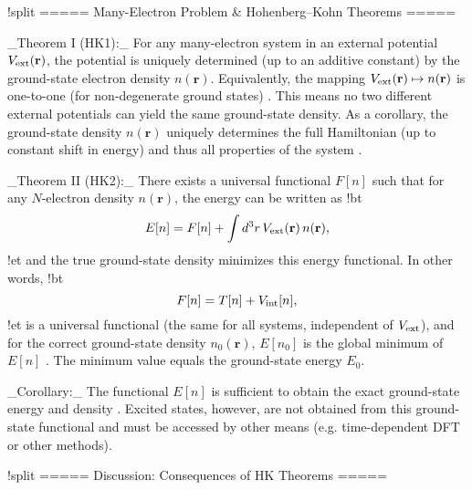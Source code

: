 !split
===== Many-Electron Problem & Hohenberg–Kohn Theorems =====


_Theorem I (HK1):_ For any many-electron system in an external potential $V_{\rm ext}(\mathbf{r})$, the potential is uniquely determined (up to an additive constant) by the ground-state electron density $n(\mathbf{r})$. Equivalently, the mapping $V_{\rm ext}(\mathbf{r}) \mapsto n(\mathbf{r})$ is one-to-one (for non-degenerate ground states) . This means no two different external potentials can yield the same ground-state density. As a corollary, the ground-state density $n(\mathbf{r})$ uniquely determines the full Hamiltonian (up to constant shift in energy) and thus all properties of the system .

_Theorem II (HK2):_ There exists a universal functional $F[n]$ such that for any $N$-electron density $n(\mathbf{r})$, the energy can be written as
!bt
\[
E[n] = F[n] + \int d^3r\,V_{\rm ext}(\mathbf{r})\,n(\mathbf{r}),
\]
!et
and the true ground-state density minimizes this energy functional. In other words,
!bt
\[
F[n] = T[n] + V_{\rm int}[n],
\]
!et
is a universal functional (the same for all systems, independent of $V_{\rm ext}$), and for the correct ground-state density $n_0(\mathbf{r})$, $E[n_0]$ is the global minimum of $E[n]$ . The minimum value equals the ground-state energy $E_0$.

_Corollary:_ The functional $E[n]$ is sufficient to obtain the exact ground-state energy and density . Excited states, however, are not obtained from this ground-state functional and must be accessed by other means (e.g. time-dependent DFT or other methods).

!split
===== Discussion: Consequences of HK Theorems =====

